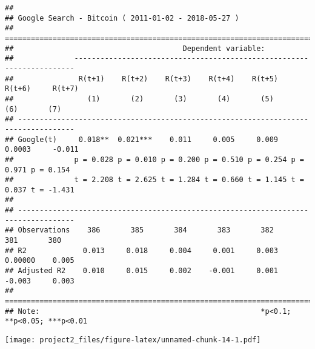 \documentclass[
]{article}
\newenvironment{Shaded}{\begin{snugshade}}{\end{snugshade}}
\newcommand{\DataTypeTok}[1]{\textcolor[rgb]{0.13,0.29,0.53}{#1}}
\newcommand{\KeywordTok}[1]{\textcolor[rgb]{0.13,0.29,0.53}{\textbf{#1}}}
\newcommand{\NormalTok}[1]{#1}
\newcommand{\OperatorTok}[1]{\textcolor[rgb]{0.81,0.36,0.00}{\textbf{#1}}}
\newcommand{\StringTok}[1]{\textcolor[rgb]{0.31,0.60,0.02}{#1}}
\begin{document}
\begin{verbatim}
## 
## Google Search - Bitcoin ( 2011-01-02 - 2018-05-27 )
## ===================================================================================
##                                       Dependent variable:                          
##              ----------------------------------------------------------------------
##               R(t+1)    R(t+2)    R(t+3)    R(t+4)    R(t+5)    R(t+6)     R(t+7)  
##                 (1)       (2)       (3)       (4)       (5)       (6)       (7)    
## -----------------------------------------------------------------------------------
## Google(t)     0.018**  0.021***    0.011     0.005     0.009    0.0003     -0.011  
##              p = 0.028 p = 0.010 p = 0.200 p = 0.510 p = 0.254 p = 0.971 p = 0.154 
##              t = 2.208 t = 2.625 t = 1.284 t = 0.660 t = 1.145 t = 0.037 t = -1.431
##                                                                                    
## -----------------------------------------------------------------------------------
## Observations    386       385       384       383       382       381       380    
## R2             0.013     0.018     0.004     0.001     0.003    0.00000    0.005   
## Adjusted R2    0.010     0.015     0.002    -0.001     0.001    -0.003     0.003   
## ===================================================================================
## Note:                                                   *p<0.1; **p<0.05; ***p<0.01
\end{verbatim}

\begin{Shaded}
\end{Shaded}

\texttt{[image: project2\_files/figure-latex/unnamed-chunk-14-1.pdf]}
\end{document}
